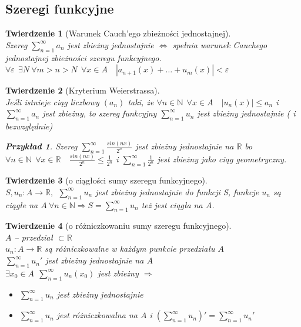 \documentclass[12pt,a4paper]{article}
\newtheorem{tw}{Twierdzenie}
\newtheorem{przyklad}{Przykład}
\theoremstyle{definition}
\begin{document}
\subsection{Szeregi funkcyjne}
\begin{tw}[Warunek Cauch'ego zbieżności jednostajnej]~\\
Szereg $\sum\limits_{n=1}^\infty a_n$ jest zbieżny jednostajnie $\Leftrightarrow$ spełnia warunek Cauchego jednostajnej zbieżności szeregu funkcyjnego.
$\forall \varepsilon ~~\exists N ~ \forall m>n>N ~~ \forall x\in A \quad |a_{n+1}(x) + \dots + u_m(x)| < \varepsilon $
\end{tw}

\begin{tw}[Kryterium Weierstrassa]~\\
Jeśli istnieje ciąg liczbowy $(a_n)$ taki, że $\forall n\in \mathbb{N} ~~ \forall x\in A \quad |u_n(x)|\leqslant a_n$ i $\sum\limits_{n=1}^\infty a_n$ jest zbieżny, to szereg funkcyjny $\sum\limits_{n=1}^\infty u_n$ jest zbieżny jednostajnie ( i bezwzględnie)
\begin{przyklad}
Szereg $\sum\limits_{n=1}^\infty \frac{sin(nx)}{2^n}$ jest zbieżny jednostajnie na $\mathbb{R}$ bo
$\forall n\in \mathbb{N} ~~ \forall x\in\mathbb{R} \quad \frac{sin(nx)}{2^n} \leqslant \frac{1}{2^n} $ i $\sum\limits_{n=1}^\infty \frac{1}{2^n}$ jest zbieżny jako ciąg geometryczny.
\end{przyklad}
\end{tw}

\begin{tw}[o ciągłości sumy szeregu funkcyjnego]~\\
$S, u_n: A \to \mathbb{R}, ~~ \sum\limits_{n=1}^\infty u_n$ jest zbieżny jednostajnie do funkcji S, funkcje $u_n$ są ciągłe na $A~ \forall n\in\mathbb{N} \Rightarrow S=\sum\limits_{n=1}^\infty u_n$ też jest ciągła na $A$.
\end{tw}

\begin{tw}[o różniczkowaniu sumy szeregu funkcyjnego]~\\
$A$ -- przedział $\subset \mathbb{R}$\\
$u_n: A \to \mathbb{R}$ są różniczkowalne w każdym punkcie przedziału $A$\\
$\sum\limits_{n=1}^\infty u_n'$ jest zbieżny jednostajnie na $A$\\
$\exists x_0\in A ~~ \sum\limits_{n=1}^\infty u_n(x_0)$ jest zbieżny $\Rightarrow$
\begin{itemize}
	\item $\sum\limits_{n=1}^\infty u_n$ jest zbieżny jednostajnie
	\item $\sum\limits_{n=1}^\infty u_n$ jest różniczkowalna na $A$ i $(\sum\limits_{n=1}^\infty u_n)' = \sum\limits_{n=1}^\infty u_n'$
\end{itemize}
\end{tw}
\end{document}
